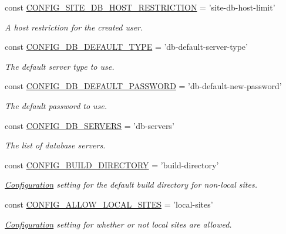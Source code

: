 \begin{DoxyCompactItemize}
const \hyperlink{group__config_ga98433c135bef21924ba2ba4e4efc74e0}{C\-O\-N\-F\-I\-G\-\_\-\-S\-I\-T\-E\-\_\-\-D\-B\-\_\-\-H\-O\-S\-T\-\_\-\-R\-E\-S\-T\-R\-I\-C\-T\-I\-O\-N} = 'site-\/db-\/host-\/limit'
\begin{DoxyCompactList}\small\item\em A host restriction for the created user. \end{DoxyCompactList}\item 
const \hyperlink{group__config_ga070bb7c438b9a8de8aa4b6704f5f039d}{C\-O\-N\-F\-I\-G\-\_\-\-D\-B\-\_\-\-D\-E\-F\-A\-U\-L\-T\-\_\-\-T\-Y\-P\-E} = 'db-\/default-\/server-\/type'
\begin{DoxyCompactList}\small\item\em The default server type to use. \end{DoxyCompactList}\item 
const \hyperlink{group__config_ga7ff5e4ec0720dbe08189449eb5ac36b5}{C\-O\-N\-F\-I\-G\-\_\-\-D\-B\-\_\-\-D\-E\-F\-A\-U\-L\-T\-\_\-\-P\-A\-S\-S\-W\-O\-R\-D} = 'db-\/default-\/new-\/password'
\begin{DoxyCompactList}\small\item\em The default password to use. \end{DoxyCompactList}\item 
const \hyperlink{group__config_ga318a2351a501b3e084a61a6c123177fb}{C\-O\-N\-F\-I\-G\-\_\-\-D\-B\-\_\-\-S\-E\-R\-V\-E\-R\-S} = 'db-\/servers'
\begin{DoxyCompactList}\small\item\em The list of database servers. \end{DoxyCompactList}\item 
const \hyperlink{group__config_ga4b310f9950b16bab770394d65f81ec26}{C\-O\-N\-F\-I\-G\-\_\-\-B\-U\-I\-L\-D\-\_\-\-D\-I\-R\-E\-C\-T\-O\-R\-Y} = 'build-\/directory'
\begin{DoxyCompactList}\small\item\em \hyperlink{classConfiguration}{Configuration} setting for the default build directory for non-\/local sites. \end{DoxyCompactList}\item 
const \hyperlink{group__config_gacf40761d602f54e08ec28ee36cb85c5f}{C\-O\-N\-F\-I\-G\-\_\-\-A\-L\-L\-O\-W\-\_\-\-L\-O\-C\-A\-L\-\_\-\-S\-I\-T\-E\-S} = 'local-\/sites'
\begin{DoxyCompactList}\small\item\em \hyperlink{classConfiguration}{Configuration} setting for whether or not local sites are allowed. \end{DoxyCompactList}\end{DoxyCompactItemize}


